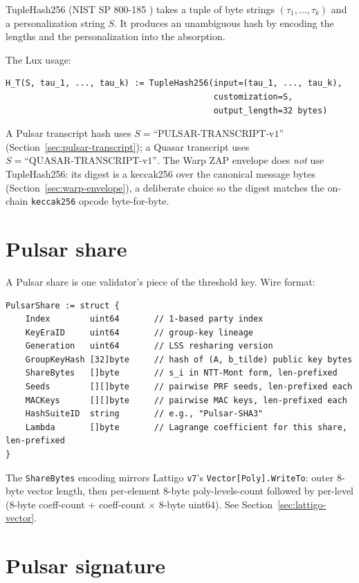 \documentclass[11pt,a4paper]{article}
\begin{document}
TupleHash256 (NIST SP 800-185 \cite{nistsp800185}) takes a tuple of byte strings $(\tau_1, \ldots, \tau_k)$ and a personalization string $S$. It produces an unambiguous hash by encoding the lengths and the personalization into the absorption.

The Lux usage:

\begin{lstlisting}
H_T(S, tau_1, ..., tau_k) := TupleHash256(input=(tau_1, ..., tau_k),
                                          customization=S,
                                          output_length=32 bytes)
\end{lstlisting}

A Pulsar transcript hash uses $S = \text{``PULSAR-TRANSCRIPT-v1''}$ (Section~\ref{sec:pulsar-transcript}); a Quasar transcript uses $S = \text{``QUASAR-TRANSCRIPT-v1''}$. The Warp ZAP envelope does \emph{not} use TupleHash256: its digest is a keccak256 over the canonical message bytes (Section~\ref{sec:warp-envelope}), a deliberate choice so the digest matches the on-chain \texttt{keccak256} opcode byte-for-byte.

\section{Pulsar share}

A Pulsar share is one validator's piece of the threshold key. Wire format:

\begin{lstlisting}
PulsarShare := struct {
    Index        uint64       // 1-based party index
    KeyEraID     uint64       // group-key lineage
    Generation   uint64       // LSS resharing version
    GroupKeyHash [32]byte     // hash of (A, b_tilde) public key bytes
    ShareBytes   []byte       // s_i in NTT-Mont form, len-prefixed
    Seeds        [][]byte     // pairwise PRF seeds, len-prefixed each
    MACKeys      [][]byte     // pairwise MAC keys, len-prefixed each
    HashSuiteID  string       // e.g., "Pulsar-SHA3"
    Lambda       []byte       // Lagrange coefficient for this share, len-prefixed
}
\end{lstlisting}

The \texttt{ShareBytes} encoding mirrors Lattigo \texttt{v7}'s \texttt{Vector[Poly].WriteTo}: outer 8-byte vector length, then per-element 8-byte poly-levels-count followed by per-level (8-byte coeff-count + coeff-count $\times$ 8-byte uint64). See Section~\ref{sec:lattigo-vector}.

\section{Pulsar signature}
\end{document}
